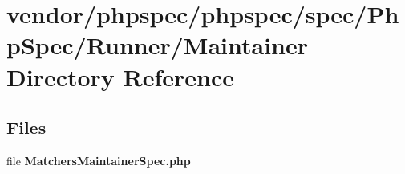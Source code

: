 \section{vendor/phpspec/phpspec/spec/\+Php\+Spec/\+Runner/\+Maintainer Directory Reference}
\label{dir_b7ef9a0c6bc98a537cbd5f9a15939a2c}
\subsection*{Files}
\begin{DoxyCompactItemize}
\item 
file {\bf Matchers\+Maintainer\+Spec.\+php}
\end{DoxyCompactItemize}
